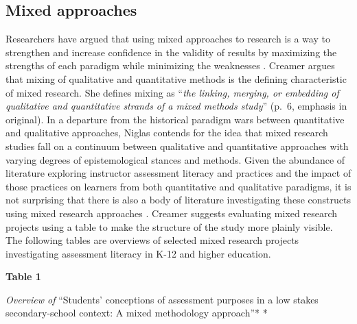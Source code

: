 \documentclass[
]{book}
\begin{document}
\hypertarget{mixed-approaches}{%
\subsection*{Mixed approaches}\label{mixed-approaches}}

Researchers have argued that using mixed approaches to research is a way to strengthen and increase confidence in the validity of results by maximizing the strengths of each paradigm while minimizing the weaknesses \citep{creswellResearchDesignQualitative2009, mckimValueMixedMethods2017}. Creamer \citeyearpar{creamerIntroductionFullyIntegrated2018} argues that mixing of qualitative and quantitative methods is the defining characteristic of mixed research. She defines mixing as ``\emph{the linking, merging, or embedding of qualitative and quantitative strands of a mixed methods study}'' (p.~6, emphasis in original). In a departure from the historical paradigm wars between quantitative and qualitative approaches, Niglas \citeyearpar{niglasMultidimensionalModelResearch2010} contends for the idea that mixed research studies fall on a continuum between qualitative and quantitative approaches with varying degrees of epistemological stances and methods. Given the abundance of literature exploring instructor assessment literacy and practices and the impact of those practices on learners from both quantitative and qualitative paradigms, it is not surprising that there is also a body of literature investigating these constructs using mixed research approaches \citep{esfandiariMixedmethodsCrosssectionalStudy2016, ogan-bekirogluPreServiceTeachers2014, solomonidouStudentsConceptionsAssessment2017}. Creamer \citeyearpar{creamerIntroductionFullyIntegrated2018} suggests evaluating mixed research projects using a table to make the structure of the study more plainly visible. The following tables are overviews of selected mixed research projects investigating assessment literacy in K-12 and higher education.

\textbf{Table 1}

\emph{Overview of }``Students' conceptions of assessment purposes in a low stakes secondary-school context: A mixed methodology approach''* \citep{solomonidouStudentsConceptionsAssessment2017}*
\end{document}
